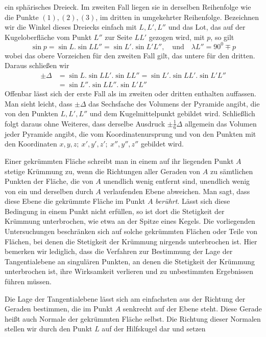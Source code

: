 ein sphärisches Dreieck. Im zweiten Fall liegen sie in derselben Reihenfolge wie die Punkte \((1),(2),(3)\), im dritten in umgekehrter Reihenfolge. Bezeichnen wir die Winkel dieses Dreiecks einfach mit \(L,L',L''\) und das Lot, das auf der Kugeloberfläche vom Punkt \(L''\) zur Seite \(LL'\) gezogen wird, mit \(p\), so gilt
\[
\sin p=\sin L\mathord{.}\sin LL''=\sin L'\mathord{.}\sin L'L'',\quad\text{und}\quad\lambda L''=90^0\mp p
\]
\noindent wobei das obere Vorzeichen für den zweiten Fall gilt, das untere für den dritten. Daraus schließen wir
\[
\begin{aligned}
\pm\Delta&=\sin L\mathord{.}\sin LL'\mathord{.}\sin LL''=\sin L'\mathord{.}\sin LL'\mathord{.}\sin L'L''\\
&=\sin L''\mathord{.}\sin LL''\mathord{.}\sin L'L''
\end{aligned}
\]
\noindent Offenbar lässt sich der erste Fall als im zweiten oder dritten enthalten auffassen. Man sieht leicht, dass \(\pm\Delta\) das Sechsfache des Volumens der Pyramide angibt, die von den Punkten \(L,L',L''\) und dem Kugelmittelpunkt gebildet wird. Schließlich folgt daraus ohne Weiteres, dass derselbe Ausdruck \(\pm\tfrac{1}{6}\Delta\) allgemein das Volumen jeder Pyramide angibt, die vom Koordinatenursprung und von den Punkten mit den Koordinaten \(x,y,z;\ x',y',z';\ x'',y'',z''\) gebildet wird.

\indent Einer gekrümmten Fläche schreibt man in einem auf ihr liegenden Punkt \(A\) stetige Krümmung zu, wenn die Richtungen aller Geraden von \(A\) zu sämtlichen Punkten der Fläche, die von \(A\) unendlich wenig entfernt sind, unendlich wenig von ein und derselben durch \(A\) verlaufenden Ebene abweichen. Man sagt, dass diese Ebene die gekrümmte Fläche im Punkt \(A\) \textit{berührt}. Lässt sich diese Bedingung in einem Punkt nicht erfüllen, so ist dort die Stetigkeit der Krümmung unterbrochen, wie etwa an der Spitze eines Kegels. Die vorliegenden Untersuchungen beschränken sich auf solche gekrümmten Flächen oder Teile von Flächen, bei denen die Stetigkeit der Krümmung nirgends unterbrochen ist. Hier bemerken wir lediglich, dass die Verfahren zur Bestimmung der Lage der Tangentialebene an singulären Punkten, an denen die Stetigkeit der Krümmung unterbrochen ist, ihre Wirksamkeit verlieren und zu unbestimmten Ergebnissen führen müssen.

\indent Die Lage der Tangentialebene lässt sich am einfachsten aus der Richtung der Geraden bestimmen, die im Punkt \(A\) senkrecht auf der Ebene steht. Diese Gerade heißt auch Normale der gekrümmten Fläche selbst. Die Richtung dieser Normalen stellen wir durch den Punkt \(L\) auf der Hilfskugel dar und setzen
